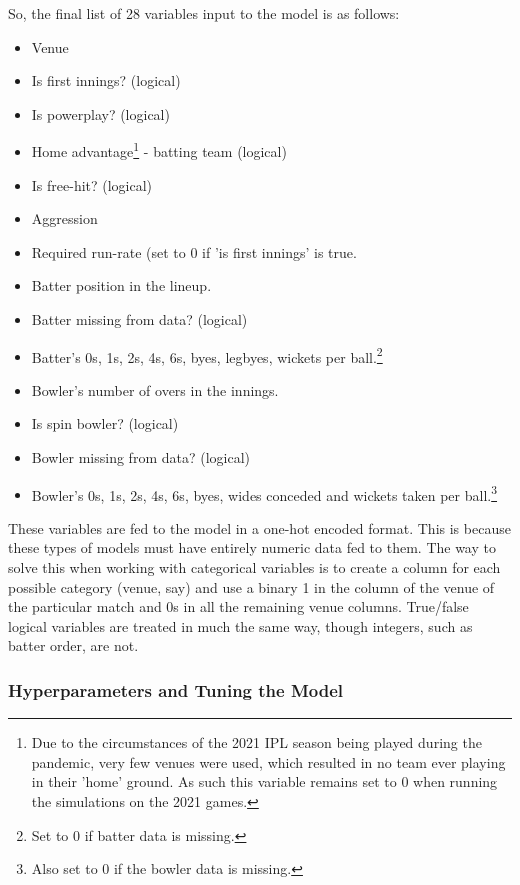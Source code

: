 So, the final list of 28 variables input to the model is as follows:
\begin{itemize}
    \itemsep-0.25em
    \renewcommand\labelitemi{-}
    \item Venue
    \item Is first innings? (logical)
    \item Is powerplay? (logical)
    \item Home advantage\footnote{Due to the circumstances of the 2021 IPL season being played during the pandemic, very few venues were used, which resulted in no team ever playing in their 'home' ground. As such this variable remains set to 0 when running the simulations on the 2021 games.} - batting team (logical)
    \item Is free-hit? (logical)
    \item Aggression
    \item Required run-rate (set to 0 if 'is first innings' is true.
    \item Batter position in the lineup.
    \item Batter missing from data? (logical)
    \item Batter's 0s, 1s, 2s, 4s, 6s, byes, legbyes, wickets per ball.\footnote{Set to 0 if batter data is missing.}
    \item Bowler's number of overs in the innings.
    \item Is spin bowler? (logical)
    \item Bowler missing from data? (logical)
    \item Bowler's 0s, 1s, 2s, 4s, 6s, byes, wides conceded and wickets taken per ball.\footnote{Also set to 0 if the bowler data is missing.}
\end{itemize}

These variables are fed to the model in a one-hot encoded format. This is because these types of models must have entirely numeric data fed to them. The way to solve this when working with categorical variables is to create a column for each possible category (venue, say) and use a binary 1 in the column of the venue of the particular match and 0s in all the remaining venue columns. True/false logical variables are treated in much the same way, though integers, such as batter order, are not.

\subsubsection{Hyperparameters and Tuning the Model}

